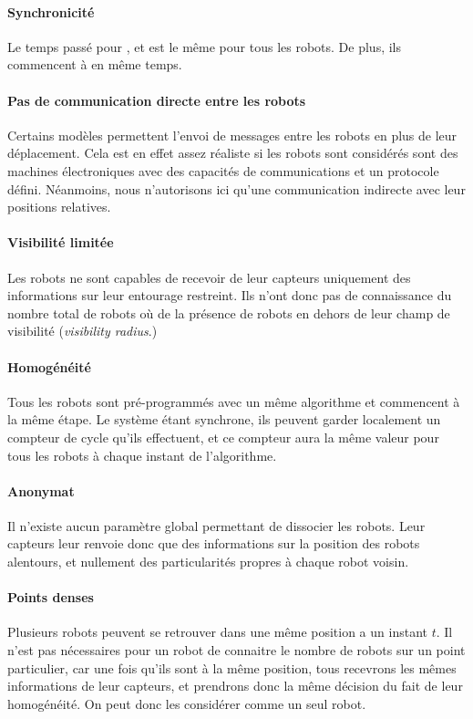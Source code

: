 \paragraph{Synchronicité} Le temps passé pour \Observer, \Calculer et
\SeDeplacer est le même pour tous les robots. De plus, ils commencent à
\Observer en même temps.

\paragraph{Pas de communication directe entre les robots} Certains modèles
permettent l'envoi de messages entre les robots en plus de leur déplacement.
Cela est en effet assez réaliste si les robots sont considérés sont des
machines électroniques avec des capacités de communications et un protocole
défini. Néanmoins, nous n'autorisons ici qu'une communication indirecte avec
leur positions relatives.

\paragraph{Visibilité limitée} Les robots ne sont capables de recevoir de leur
capteurs uniquement des informations sur leur entourage restreint. Ils n'ont
donc pas de connaissance du nombre total de robots où de la présence de robots
en dehors de leur champ de visibilité (\textit{visibility radius}.)

\paragraph{Homogénéité} Tous les robots sont pré-programmés avec un même
algorithme et commencent à la même étape. Le système étant synchrone, ils
peuvent garder localement un compteur de cycle qu'ils effectuent, et ce
compteur aura la même valeur pour tous les robots à chaque instant de
l'algorithme.

\paragraph{Anonymat} Il n'existe aucun paramètre global permettant de dissocier
les robots. Leur capteurs leur renvoie donc que des informations sur la
position des robots alentours, et nullement des particularités propres à chaque
robot voisin.

\paragraph{Points denses} Plusieurs robots peuvent se retrouver dans une même
position a un instant $t$. Il n'est pas nécessaires pour un robot de connaitre
le nombre de robots sur un point particulier, car une fois qu'ils sont à la
même position, tous recevrons les mêmes informations de leur capteurs, et
prendrons donc la même décision du fait de leur homogénéité. On peut donc les
considérer comme un seul robot.

